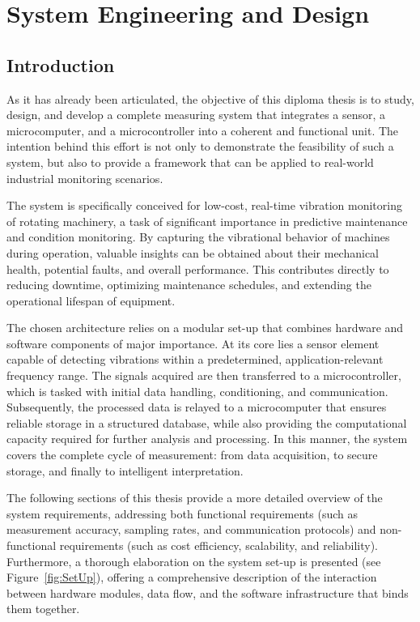 \chapter{System Engineering and Design}  
\label{chap3}  

\section{Introduction} 
{	
	As it has already been articulated, the objective of this diploma thesis is to study, design, and develop a complete measuring system that integrates a sensor, a microcomputer, and a microcontroller into a coherent and functional unit. The intention behind this effort is not only to demonstrate the feasibility of such a system, but also to provide a framework that can be applied to real-world industrial monitoring scenarios.
	
	The system is specifically conceived for low-cost, real-time vibration monitoring of rotating machinery, a task of significant importance in predictive maintenance and condition monitoring. By capturing the vibrational behavior of machines during operation, valuable insights can be obtained about their mechanical health, potential faults, and overall performance. This contributes directly to reducing downtime, optimizing maintenance schedules, and extending the operational lifespan of equipment.
	
	The chosen architecture relies on a modular set-up that combines hardware and software components of major importance. At its core lies a sensor element capable of detecting vibrations within a predetermined, application-relevant frequency range. The signals acquired are then transferred to a microcontroller, which is tasked with initial data handling, conditioning, and communication. Subsequently, the processed data is relayed to a microcomputer that ensures reliable storage in a structured database, while also providing the computational capacity required for further analysis and processing. In this manner, the system covers the complete cycle of measurement: from data acquisition, to secure storage, and finally to intelligent interpretation.
	
	The following sections of this thesis provide a more detailed overview of the system requirements, addressing both functional requirements (such as measurement accuracy, sampling rates, and communication protocols) and non-functional requirements (such as cost efficiency, scalability, and reliability). Furthermore, a thorough elaboration on the system set-up is presented (see Figure~\ref{fig:SetUp}), offering a comprehensive description of the interaction between hardware modules, data flow, and the software infrastructure that binds them together.
	
}
